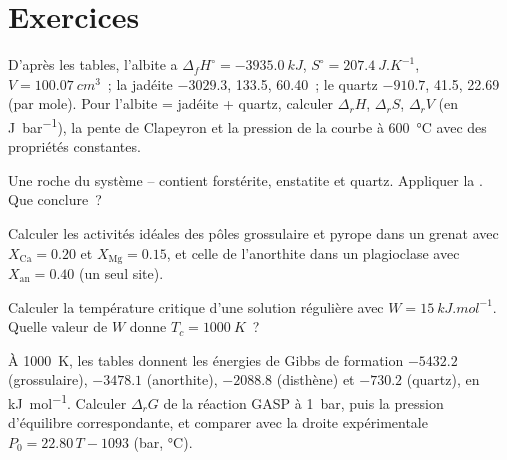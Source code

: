 \section{Exercices}

\begin{exercise}[$\star$]\label{exo:b3:petrological-thermodynamics:1}
D'après les tables, l'albite a $\Delta_fH^\circ = \qty{-3935.0}{kJ}$, $S^\circ =
\qty{207.4}{J.K^{-1}}$, $V = \qty{100.07}{cm^3}$~; la jadéite $-3029.3$, 133.5,
60.40~; le quartz $-910.7$, 41.5, 22.69 (par mole). Pour l'albite = jadéite + quartz,
calculer $\Delta_rH$, $\Delta_rS$, $\Delta_rV$ (en \unit{J.bar^{-1}}), la
pente de Clapeyron et la pression de la courbe à \qty{600}{\celsius} avec
des propriétés constantes.
\end{exercise}

\begin{exercise}[$\star$]\label{exo:b3:petrological-thermodynamics:2}
Une roche du système -- contient forstérite, enstatite et
quartz. Appliquer la . Que conclure~?
\end{exercise}

\begin{exercise}[$\star$]\label{exo:b3:petrological-thermodynamics:3}
Calculer les activités idéales des pôles grossulaire et pyrope dans un grenat avec
$X_{\text{Ca}} = 0.20$ et $X_{\text{Mg}} = 0.15$, et celle de l'anorthite dans un
plagioclase avec $X_{\text{an}} = 0.40$ (un seul site).
\end{exercise}

\begin{exercise}[$\star$]\label{exo:b3:petrological-thermodynamics:4}
Calculer la température critique d'une solution régulière avec $W =
\qty{15}{kJ.mol^{-1}}$. Quelle valeur de $W$ donne $T_c = \qty{1000}{K}$~?
\end{exercise}

\begin{exercise}[$\star\star$]\label{exo:b3:petrological-thermodynamics:5}
À \qty{1000}{K}, les tables donnent les énergies de Gibbs de formation
$-5432.2$ (grossulaire), $-3478.1$ (anorthite), $-2088.8$ (disthène) et $-730.2$
(quartz), en \unit{kJ.mol^{-1}}. Calculer $\Delta_rG$ de la réaction GASP à
\qty{1}{bar}, puis la pression d'équilibre correspondante, et comparer avec la droite
expérimentale $P_0 = 22.80\,T - 1093$ (bar, \unit{\celsius}).
\end{exercise}

